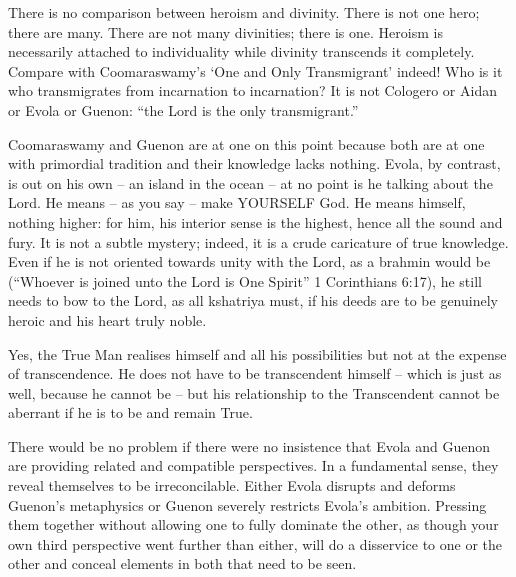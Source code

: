 \begin{footnotesize}
\begin{sffamily}
There is no comparison between heroism and divinity. There is not one hero; there are many. There are not many divinities; there is one. Heroism is necessarily attached to individuality while divinity transcends it completely. Compare with Coomaraswamy's `One and Only Transmigrant' indeed! Who is it who transmigrates from incarnation to incarnation? It is not Cologero or Aidan or Evola or Guenon: ``the Lord is the only transmigrant.''

Coomaraswamy and Guenon are at one on this point because both are at one with primordial tradition and their knowledge lacks nothing. Evola, by contrast, is out on his own -- an island in the ocean -- at no point is he talking about the Lord. He means -- as you say -- make YOURSELF God. He means himself, nothing higher: for him, his interior sense is the highest, hence all the sound and fury. It is not a subtle mystery; indeed, it is a crude caricature of true knowledge. Even if he is not oriented towards unity with the Lord, as a brahmin would be (``Whoever is joined unto the Lord is One Spirit'' 1 Corinthians 6:17), he still needs to bow to the Lord, as all kshatriya must, if his deeds are to be genuinely heroic and his heart truly noble.

Yes, the True Man realises himself and all his possibilities but not at the expense of transcendence. He does not have to be transcendent himself -- which is just as well, because he cannot be -- but his relationship to the Transcendent cannot be aberrant if he is to be and remain True.

There would be no problem if there were no insistence that Evola and Guenon are providing related and compatible perspectives. In a fundamental sense, they reveal themselves to be irreconcilable. Either Evola disrupts and deforms Guenon's metaphysics or Guenon severely restricts Evola's ambition. Pressing them together without allowing one to fully dominate the other, as though your own third perspective went further than either, will do a disservice to one or the other and conceal elements in both that need to be seen.


\end{sffamily}
\end{footnotesize}
